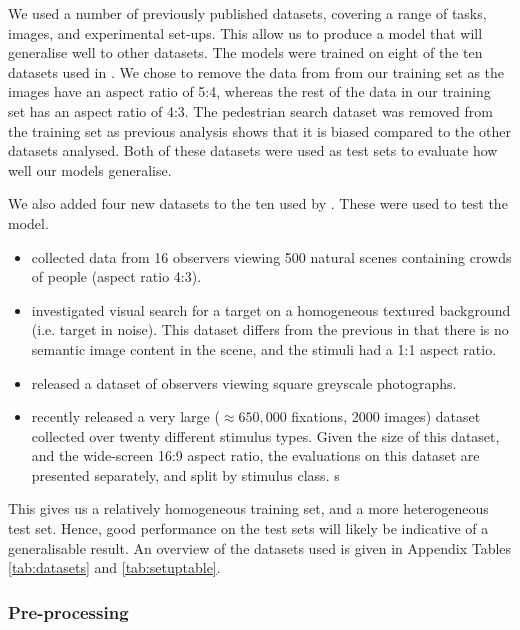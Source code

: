 \documentclass[a4paper, twocolumn, oneside, 11pt]{article}
\begin{document}
We used a number of previously published datasets, covering a range of tasks, images, and experimental set-ups. This allow us to produce a model that will generalise well to other datasets. The models were trained on eight of the ten datasets used in \cite{clarke-tatler2014}. We chose to remove the data from \cite{asher2013} from our training set as the images have an aspect ratio of 5:4, whereas the rest of the data in our training set has an aspect ratio of 4:3. The pedestrian search dataset \citep{ehinger2009} was removed from the training set as previous analysis \citep{clarke-tatler2014} shows that it is biased compared to the other datasets analysed. Both of these datasets were used as test sets to evaluate how well our models generalise. 

We also added four new datasets to the ten used by \cite{clarke-tatler2014}. These were used to test the model. 

\begin{itemize}

\item \cite{jiang2014} collected data from 16 observers viewing 500 natural scenes containing crowds of people (aspect ratio 4:3).

\item \cite{clarke2009} investigated visual search for a target on a homogeneous textured background (i.e. target in noise). This dataset differs from the previous in that there is no semantic image content in the scene, and the stimuli had a 1:1 aspect ratio.

\item \cite{greene-wolfe2012} released a dataset of observers viewing square greyscale photographs.

\item \cite{borji2015} recently released a very large ($\approx 650,000$ fixations, 2000 images) dataset collected over twenty different stimulus types. Given the size of this dataset, and the wide-screen 16:9 aspect ratio, the evaluations on this dataset are presented separately, and split by stimulus class.
s
\end{itemize}
This gives us a relatively homogeneous training set, and a more heterogeneous test set. Hence, good performance on the test sets will likely be indicative of a generalisable result. An overview of the datasets used is given in Appendix Tables \ref{tab:datasets} and \ref{tab:setuptable}. 

\subsubsection{Pre-processing}
\end{document}
